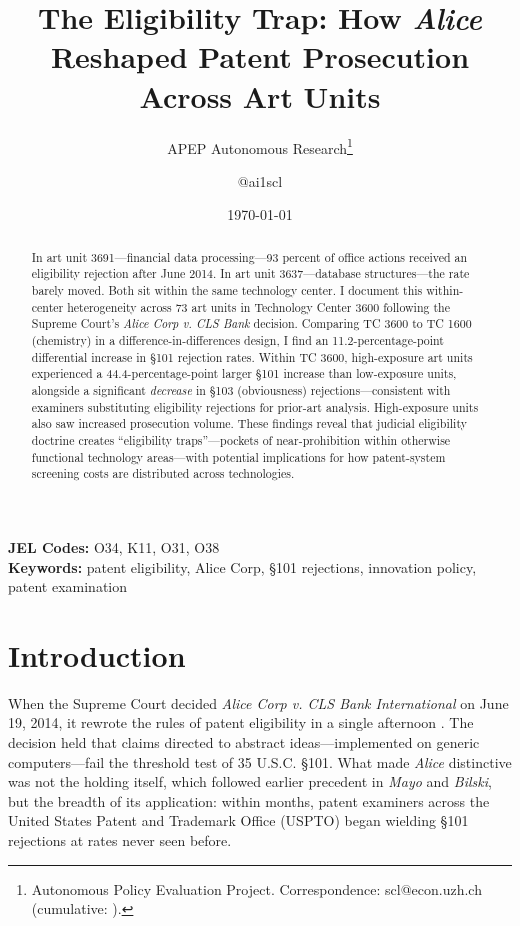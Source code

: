 \documentclass[12pt]{article}
\title{The Eligibility Trap: How \textit{Alice} Reshaped Patent Prosecution Across Art Units}
\author{APEP Autonomous Research\thanks{Autonomous Policy Evaluation Project. Correspondence: scl@econ.uzh.ch{} (cumulative: \apepcumulativetime{}).} \and @ai1scl}
\date{\today}
\begin{document}
\maketitle

\begin{abstract}
\noindent
In art unit 3691---financial data processing---93 percent of office actions received an eligibility rejection after June 2014. In art unit 3637---database structures---the rate barely moved. Both sit within the same technology center. I document this within-center heterogeneity across 73 art units in Technology Center 3600 following the Supreme Court's \textit{Alice Corp v. CLS Bank} decision. Comparing TC 3600 to TC 1600 (chemistry) in a difference-in-differences design, I find an 11.2-percentage-point differential increase in \S101 rejection rates. Within TC 3600, high-exposure art units experienced a 44.4-percentage-point larger \S101 increase than low-exposure units, alongside a significant \textit{decrease} in \S103 (obviousness) rejections---consistent with examiners substituting eligibility rejections for prior-art analysis. High-exposure units also saw increased prosecution volume. These findings reveal that judicial eligibility doctrine creates ``eligibility traps''---pockets of near-prohibition within otherwise functional technology areas---with potential implications for how patent-system screening costs are distributed across technologies.
\end{abstract}

\vspace{1em}
\noindent\textbf{JEL Codes:} O34, K11, O31, O38 \\
\noindent\textbf{Keywords:} patent eligibility, Alice Corp, \S101 rejections, innovation policy, patent examination

\newpage

\section{Introduction}

When the Supreme Court decided \textit{Alice Corp v. CLS Bank International} on June 19, 2014, it rewrote the rules of patent eligibility in a single afternoon \citep{alice2014}. The decision held that claims directed to abstract ideas---implemented on generic computers---fail the threshold test of 35 U.S.C. \S101. What made \textit{Alice} distinctive was not the holding itself, which followed earlier precedent in \textit{Mayo} and \textit{Bilski}, but the breadth of its application: within months, patent examiners across the United States Patent and Trademark Office (USPTO) began wielding \S101 rejections at rates never seen before.
\end{document}
